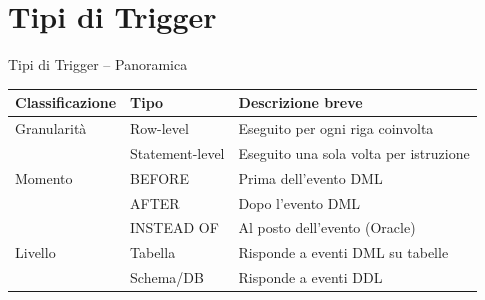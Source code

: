 \documentclass[aspectratio=169]{beamer}
\begin{document}
\section{Tipi di Trigger}

\begin{frame}{Tipi di Trigger -- Panoramica}
  \begin{center}
    \begin{tabular}{lll}
      \toprule
      \textbf{Classificazione} & \textbf{Tipo} & \textbf{Descrizione breve} \\
      \midrule
      Granularità & Row-level & Eseguito per ogni riga coinvolta \\
                  & Statement-level & Eseguito una sola volta per istruzione \\
      \midrule
      Momento     & BEFORE & Prima dell'evento DML \\
                  & AFTER  & Dopo l'evento DML \\
                  & INSTEAD OF & Al posto dell'evento (Oracle) \\
      \midrule
      Livello     & Tabella & Risponde a eventi DML su tabelle \\
                  & Schema/DB & Risponde a eventi DDL \\
      \bottomrule
    \end{tabular}
  \end{center}
\end{frame}
\end{document}

